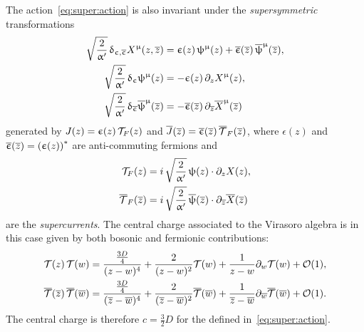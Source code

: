 The action~\eqref{eq:super:action} is also invariant under the \emph{supersymmetric} transformations
\begin{equation}
  \begin{split}
    \sqrt{\frac{2}{\upalpha'}}\,
    \updelta_{\upepsilon, \overline{\upepsilon}}
    X^{\upmu}( z, \overline{z} )
    & =
    \upepsilon( z )\, \uppsi^{\upmu}( z ) + \overline{\upepsilon}( \overline{z} )\, \overline{\uppsi}^{\upmu}( \overline{z} ),
    \\
    \sqrt{\frac{2}{\upalpha'}}\,
    \updelta_{\upepsilon} \uppsi^{\upmu}( z )
    & =
    - \upepsilon( z )\, \partial_{z} X^{\upmu}( z ),
    \\
    \sqrt{\frac{2}{\upalpha'}}\,
    \updelta_{\overline{\upepsilon}} \overline{\uppsi}^{\upmu}( \overline{z} )
    & =
    - \overline{\upepsilon}( \overline{z} )\, \partial_{\overline{z}} \overline{X}^{\upmu}( \overline{z} )
  \end{split}
\end{equation}
generated by $J( z ) = \upepsilon( z )\, \mathcal{T}_F( z )$ and $\overline{J}( \overline{z} ) = \overline{\upepsilon}( \overline{z} )\, \overline{\mathcal{T}}_F( \overline{z} )$, where $\epsilon( z )$ and $\overline{\upepsilon}( \overline{z} ) = \qty( \upepsilon( z ) )^*$ are anti-commuting fermions and
\begin{equation}
  \begin{split}
    \mathcal{T}_F( z )
    & =
    i\, \sqrt{\frac{2}{\upalpha'}}\, \uppsi( z ) \cdot \partial_{z} X( z ),
    \\
    \overline{\mathcal{T}}_F( \overline{z} )
    & =
    i\, \sqrt{\frac{2}{\upalpha'}}\, \overline{\uppsi}( \overline{z} ) \cdot \partial_{\overline{z}} \overline{X}( \overline{z} )
  \end{split}
\end{equation}
are the \emph{supercurrents}.
The central charge associated to the Virasoro algebra is in this case given by both bosonic and fermionic contributions:
\begin{equation}
  \begin{split}
    \cT( z )\, \cT( w )
    & =
    \frac{\frac{3 D}{4}}{( z - w )^4}
    +
    \frac{2}{( z - w )^2} \cT( w )
    +
    \frac{1}{z - w} \ipd{w} \cT( w )
    +
    \order{1},
    \\
    \overline{\cT}( \barz )\, \overline{\cT}( \barw )
    & =
    \frac{\frac{3 D}{4}}{( \barz - \barw )^4}
    +
    \frac{2}{( \barz - \barw )^2} \overline{\cT}( \barw )
    +
    \frac{1}{\barz - \barw} \ipd{\barw} \overline{\cT}( \barw )
    +
    \order{1}.
  \end{split}
\end{equation}
The central charge is therefore $c = \frac{3}{2} D$ for the \cft defined in~\eqref{eq:super:action}.

